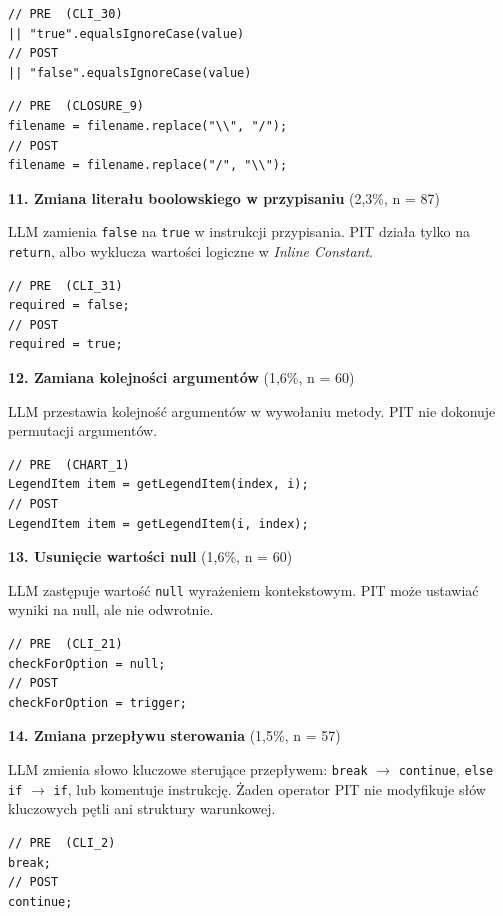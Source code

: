 \documentclass[12pt,a4paper,oldfontcommands]{memoir}
\theoremstyle{plain}
\theoremstyle{definition}
\theoremstyle{remark}
\begin{document}
    \begin{lstlisting}
// PRE  (CLI_30)
|| "true".equalsIgnoreCase(value)
// POST
|| "false".equalsIgnoreCase(value)
    \end{lstlisting}

    \begin{lstlisting}
// PRE  (CLOSURE_9)
filename = filename.replace("\\", "/");
// POST
filename = filename.replace("/", "\\");
    \end{lstlisting}

    \textbf{11. Zmiana literału boolowskiego w przypisaniu} (2,3\%, n = 87)

    LLM zamienia \texttt{false} na \texttt{true} w instrukcji przypisania.
    PIT działa tylko na \texttt{return}, albo wyklucza wartości logiczne w \textit{Inline Constant}.

    \begin{lstlisting}
// PRE  (CLI_31)
required = false;
// POST
required = true;
    \end{lstlisting}

    \textbf{12. Zamiana kolejności argumentów} (1,6\%, n = 60)

    LLM przestawia kolejność argumentów w wywołaniu metody.
    PIT nie dokonuje permutacji argumentów.

    \begin{lstlisting}
// PRE  (CHART_1)
LegendItem item = getLegendItem(index, i);
// POST
LegendItem item = getLegendItem(i, index);
    \end{lstlisting}

    \textbf{13. Usunięcie wartości null} (1,6\%, n = 60)

    LLM zastępuje wartość \texttt{null} wyrażeniem kontekstowym.
    PIT może ustawiać wyniki na null, ale nie odwrotnie.

    \begin{lstlisting}
// PRE  (CLI_21)
checkForOption = null;
// POST
checkForOption = trigger;
    \end{lstlisting}

    \textbf{14. Zmiana przepływu sterowania} (1,5\%, n = 57)

    LLM zmienia słowo kluczowe sterujące przepływem: \texttt{break} $\rightarrow$ \texttt{continue}, \texttt{else if} $\rightarrow$ \texttt{if}, lub komentuje instrukcję.
    Żaden operator PIT nie modyfikuje słów kluczowych pętli ani struktury warunkowej.

    \begin{lstlisting}
// PRE  (CLI_2)
break;
// POST
continue;
    \end{lstlisting}
\end{document}
